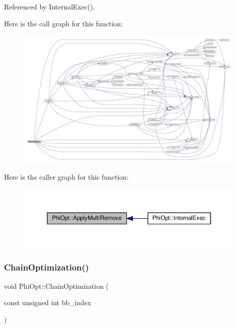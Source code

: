 Referenced by Internal\+Exec().

Here is the call graph for this function\+:
\nopagebreak
\begin{figure}[H]
\begin{center}
\leavevmode
\includegraphics[width=350pt]{dc/ddf/classPhiOpt_a4992671043b61c9366438a2387943f73_cgraph}
\end{center}
\end{figure}
Here is the caller graph for this function\+:
\nopagebreak
\begin{figure}[H]
\begin{center}
\leavevmode
\includegraphics[width=350pt]{dc/ddf/classPhiOpt_a4992671043b61c9366438a2387943f73_icgraph}
\end{center}
\end{figure}
\mbox{\label{classPhiOpt_a128433a1cf7590534b3f9f990fb19683}} 
\subsubsection{\texorpdfstring{Chain\+Optimization()}{ChainOptimization()}}
{\footnotesize\ttfamily void Phi\+Opt\+::\+Chain\+Optimization (\begin{DoxyParamCaption}\item[{const unsigned int}]{bb\+\_\+index }\end{DoxyParamCaption})\hspace{0.3cm}{\ttfamily [private]}}



